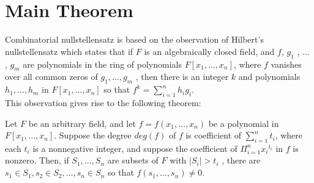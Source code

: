 \section{Main Theorem}
Combinatorial nullstellensatz is based on the observation of Hilbert's nullstellensatz which states that if $F$ is an algebraically closed field, and $f$, $g_1$ , $\ldots$ , $g_m$ are polynomials in the ring of polynomials $F[x_1 ,\ldots , x_n]$, where $f$ vanishes over all common zeros of $g_1 ,\ldots, g_m$ , then there is an integer $k$ and polynomials $h_1 , \ldots, h_m$ in $F[x_1 , \ldots , x_n]$ so that $f^k = \sum_{i=1}^{n}h_ig_i$.
\\
This observation gives rise to the following theorem:
\begin{theorem}
	Let $F$ be an arbitrary field, and let $f = f(x_1 ,\ldots, x_n)$ be a polynomial in $F[x_1 ,\ldots, x_n]$. Suppose the degree $deg(f)$ of $f$ is coefficient of $\sum_{i=1}^n t_i$, where each $t_i$ is a nonnegative integer, and suppose the coefficient of $\Pi_{i=1}^n {x_i}^{t_i}$ in $f$ is nonzero. Then, if $S_1 ,\ldots, S_n$ are subsets of $F$ with $|S_i| > t_i$ , there are $s_1 \in S_1 , s_2 \in S_2 ,\ldots, s_n \in S_n$ so that $f(s_1 , \ldots , s_n ) \neq 0$.
	\label{theorem}
\end{theorem}